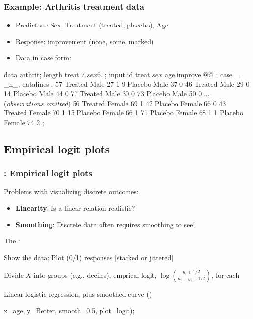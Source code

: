 \begin{frame}[fragile]
  \frametitle{Example: Arthritis treatment data}
  \begin{itemize}
  	\item \alert{Predictors}: Sex, Treatment (treated, placebo), Age
	\item \alert{Response}: improvement (none, some, marked)
	\item Data in case form:
  \end{itemize}
\begin{Input}[fontsize=\small,label=\fbox{\texttt{arthrit.sas}},baselinestretch=0.7]
data arthrit;
   length treat $7. sex $6. ;
   input id treat $ sex $ age improve @@ ;
   case = _n_;
     
datalines ;
57 Treated Male   27 1   9 Placebo Male   37 0
46 Treated Male   29 0  14 Placebo Male   44 0
77 Treated Male   30 0  73 Placebo Male   50 0
  ... (\emph{observations omitted})
56 Treated Female 69 1  42 Placebo Female 66 0
43 Treated Female 70 1  15 Placebo Female 66 1
                        71 Placebo Female 68 1
                         1 Placebo Female 74 2
;
\end{Input}
\end{frame}

\subsection{Empirical logit plots}
\begin{frame}[fragile]
  \frametitle{: Empirical logit plots}
  Problems with visualizing discrete outcomes:
  \begin{itemize}
	\item{\large\bfseries Linearity}: Is a linear relation realistic?
	\item{\large\bfseries Smoothing}: Discrete data often requires smoothing to see!
  \end{itemize}

The :
   \begin{itemize*}
   \item Show the data: Plot (0/1) responses [stacked or jittered]
   \item Divide $X$ into groups (e.g., deciles), emprical logit,
   $\log \left(\frac{y_i + 1/2}{n_i - y_i + 1/2}\right)$,
   for each
   \item Linear logistic regression, plus smoothed curve ()
   \end{itemize*}
\vspace{1ex}
\begin{Input}
    x=age, y=Better,  
    smooth=0.5,       
    plot=logit);      
\end{Input}
\end{frame}


